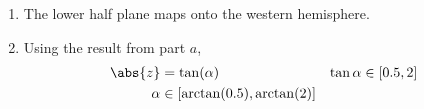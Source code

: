 \begin{enumerate}
\begin{enumerate}
              \item The lower half plane maps onto the western hemisphere.
              \item Using the result from part $ a $,
                    \begin{align}
                        \abs{z}     & = \tan(\alpha)                 &
                        \tan \alpha & \in [0.5, 2]                     \\
                        \alpha      & \in [\arctan(0.5), \arctan(2)]
                    \end{align}
          \end{enumerate}



\end{enumerate}